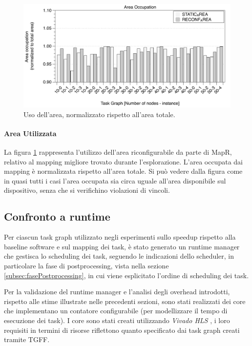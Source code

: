 \begin{figure}[t]
 \begin{center}
  \includegraphics[width=\textwidth]{./capitoli/figure/cap6/FPL_Area.pdf}
  \caption{Uso dell'area, normalizzato rispetto all'area totale.}
  \label{fig:usoArea}
 \end{center}
\end{figure}

\paragraph{Area Utilizzata}
La figura \ref{fig:usoArea} rappresenta l'utilizzo dell'area
riconfigurabile da parte di MapR, relativo al mapping migliore trovato durante
l'esplorazione. L'area occupata dai mapping \`e normalizzata rispetto all'area totale.
Si pu\`o vedere dalla figura come in quasi tutti i casi l'area occupata sia
circa uguale all'area disponibile sul dispositivo, senza che si verifichino
violazioni di vincoli.



\subsection{Confronto a runtime}
Per ciascun task graph utilizzato negli esperimenti sullo speedup rispetto alla baseline software
e sul mapping dei task, \`e stato generato un runtime manager che gestisca lo scheduling dei task,
seguendo le indicazioni dello scheduler, in particolare la fase di postprocessing, vista nella sezione
\ref{subsec:fasePostprocessing}, in cui viene esplicitato l'ordine di scheduling dei task.

Per la validazione del runtime manager e l'analisi degli overhead introdotti, rispetto alle stime
illustrate nelle precedenti sezioni, sono stati realizzati dei core che implementano un contatore
configurabile (per modellizzare il tempo di esecuzione dei task). I core sono stati creati utilizzando
\emph{Vivado HLS} \cite{VivadoHLS}, i loro requisiti in termini di risorse riflettono quanto
specificato dai task graph creati tramite \ac{TGFF}.

